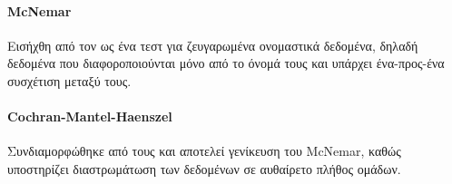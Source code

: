 \paragraph{McNemar}
Εισήχθη από τον \citet{McNemar1947} ως ένα τεστ για ζευγαρωμένα ονομαστικά δεδομένα, δηλαδή δεδομένα που διαφοροποιούνται μόνο από το όνομά τους και υπάρχει ένα-προς-ένα συσχέτιση μεταξύ τους.

\paragraph{Cochran-Mantel-Haenszel} Συνδιαμορφώθηκε από τους \citet{10.2307/3001616, doi:10.1093/jnci/22.4.719} και αποτελεί γενίκευση του McNemar, καθώς υποστηρίζει διαστρωμάτωση των δεδομένων σε αυθαίρετο πλήθος ομάδων.
